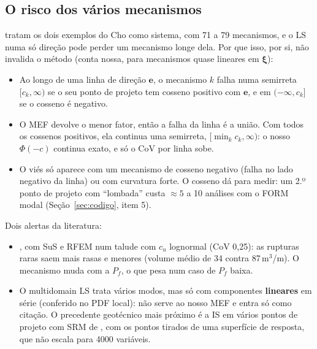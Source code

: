 \documentclass[11pt,a4paper]{article}
\begin{document}
\subsection{O risco dos vários mecanismos}\label{sec:risco}
\citet{jiang2015} tratam os dois exemplos do Cho como sistema, com 71 a 79 mecanismos, e o LS numa só direção pode
perder um mecanismo longe dela. Por que isso, por si, não invalida o método (conta nossa, para mecanismos quase
lineares em $\bm\xi$):
\begin{itemize}
  \item Ao longo de uma linha de direção $\bm e$, o mecanismo $k$ falha numa semirreta $[c_k, \infty)$ se o seu ponto
    de projeto tem cosseno positivo com $\bm e$, e em $(-\infty, c_k]$ se o cosseno é negativo.
  \item O MEF devolve o menor fator, então a falha da linha é a união. Com todos os cossenos positivos, ela continua uma
    semirreta, $[\min_k c_k, \infty)$: o nosso $\Phi(-c)$ continua exato, e só o CoV por linha sobe.
  \item O viés só aparece com um mecanismo de cosseno negativo (falha no lado negativo da linha) ou com curvatura forte.
    O cosseno dá para medir: um 2.º ponto de projeto com ``lombada'' \citep{derkiureghian1998} custa $\approx 5$ a 10
    análises com o FORM modal (Seção~\ref{sec:codigo}, item 5).
\end{itemize}
Dois alertas da literatura:
\begin{itemize}
  \item \citet{vandeneijnden2017}, com SuS e RFEM num talude com $c_u$ lognormal (CoV 0,25): as rupturas raras saem
    mais rasas e menores (volume médio de 34 contra 87\,m$^3$/m). O mecanismo muda com a $P_f$, o que pesa num caso de
    $P_f$ baixa.
  \item O multidomain LS \citep{valdebenito2021} trata vários modos, mas só com componentes \textbf{lineares} em série
    (conferido no PDF local): não serve ao nosso MEF e entra só como citação. O precedente geotécnico mais próximo é a
    IS em vários pontos de projeto com SRM de \citet{zhao2021}, com os pontos tirados de uma superfície de resposta, que
    não escala para 4000 variáveis.
\end{itemize}
\end{document}
